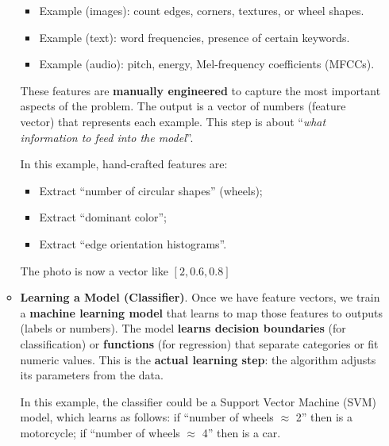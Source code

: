 \begin{itemize}
\begin{examplebox}
\begin{itemize}
            \begin{itemize}
                \item Example (images): count edges, corners, textures, or wheel shapes.
                \item Example (text): word frequencies, presence of certain keywords.
                \item Example (audio): pitch, energy, Mel-frequency coefficients (MFCCs).
            \end{itemize}
            These features are \textbf{manually engineered} to capture the most important aspects of the problem. The output is a vector of numbers (feature vector) that represents each example. This step is about ``\emph{what information to feed into the model}''.

            In this example, hand-crafted features are:
            \begin{itemize}
                \item Extract ``number of circular shapes'' (wheels);
                \item Extract ``dominant color'';
                \item Extract ``edge orientation histograms''.
            \end{itemize}
            The photo is now a vector like $\left[2, 0.6, 0.8\right]$


            \item \textbf{Learning a Model (Classifier)}. Once we have feature vectors, we train a \textbf{machine learning model} that learns to map those features to outputs (labels or numbers). The model \textbf{learns decision boundaries} (for classification) or \textbf{functions} (for regression) that separate categories or fit numeric values. This is the \textbf{actual learning step}: the algorithm adjusts its parameters from the data.
            
            In this example, the classifier could be a Support Vector Machine (SVM) model, which learns as follows: if ``number of wheels $\approx$ 2'' then is a motorcycle; if ``number of wheels $\approx$ 4'' then is a car.
        \end{itemize}
    \end{examplebox}



\end{itemize}
